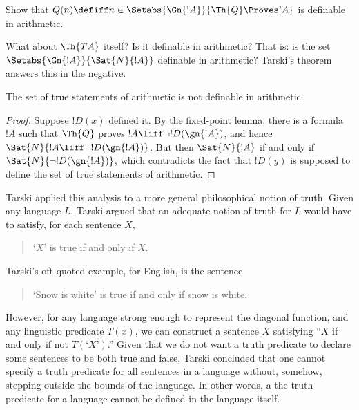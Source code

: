 \documentclass[../../include/open-logic-section]{subfiles}
\begin{document}
\begin{prob}
Show that $Q(n) \defiff n \in \Setabs{\Gn{!A}}{\Th{Q} \Proves !A}$ is
  definable in arithmetic.
\end{prob}

What about $\Th{TA}$ itself? Is it definable in arithmetic? That
is: is the set $\Setabs{\Gn{!A}}{\Sat{N}{!A}}$ definable in
arithmetic? Tarski's theorem answers this in the negative.

\begin{thm}
The set of true statements of arithmetic is not definable in arithmetic.
\end{thm}

\begin{proof} 
Suppose $!D(x)$ defined it. By the fixed-point lemma, there is a
formula $!A$ such that $\Th{Q}$ proves $!A \liff \lnot !D(\gn{!A})$,
and hence $\Sat{N}{!A \liff \lnot !D(\gn{!A})}$. But then
$\Sat{N}{!A}$ if and only if $\Sat{N}{\lnot !D(\gn{!A})}$, which
contradicts the fact that $!D(y)$ is supposed to define the set of true
statements of arithmetic.  
\end{proof}

Tarski applied this analysis to a more general philosophical notion of
truth. Given any language $L$, Tarski argued that an adequate notion
of truth for $L$ would have to satisfy, for each sentence $X$,
\begin{quote}
`$X$' is true if and only if $X$.
\end{quote}
Tarski's oft-quoted example, for English, is the sentence
\begin{quote}
`Snow is white' is true if and only if snow is white.
\end{quote}
However, for any language strong enough to represent the diagonal
function, and any linguistic predicate $T(x)$, we can construct a
sentence $X$ satisfying ``$X$ if and only if not $T(\text{`$X$'})$.''
Given that we do not want a truth predicate to declare some sentences
to be both true and false, Tarski concluded that one cannot specify a
truth predicate for all sentences in a language without, somehow,
stepping outside the bounds of the language. In other words, a the
truth predicate for a language cannot be defined in the language
itself.
\end{document}
